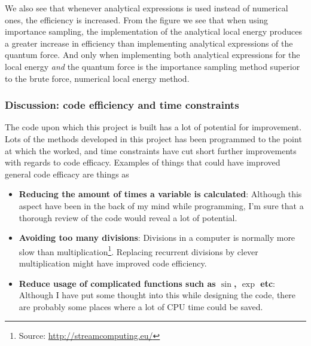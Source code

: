 We also see that whenever analytical expressions is used instead of numerical ones, the efficiency is increased. 
From the figure we see that when using importance sampling, the implementation of the analytical local energy produces a greater increase in efficiency than implementing analytical expressions of the quantum force.
And only when implementing both analytical expressions for the local energy \textit{and} the quantum force is the importance sampling method superior to the brute force, numerical local energy method. 





















\subsubsection{Discussion: code efficiency and time constraints}\label{sec:ce_tc}

The code upon which this project is built has a lot of potential for improvement. 
Lots of the methods developed in this project has been programmed to the point at which the worked, and time constraints have cut short further improvements with regards to code efficacy.
Examples of things that could have improved general code efficacy are things as 

\begin{itemize}
	\item \textbf{Reducing the amount of times a variable is calculated}:
	Although this aspect have been in the back of my mind while programming, I'm sure that a thorough review of the code would reveal a lot of potential. 
	\item \textbf{Avoiding too many divisions}: 
	Divisions in a computer is normally more slow than multiplication\footnote{Source: \href{http://streamcomputing.eu/blog/2012-07-16/how-expensive-is-an-operation-on-a-cpu/}{http://streamcomputing.eu/}}. Replacing recurrent divisions by clever multiplication might have improved code efficiency.
	\item \textbf{Reduce usage of complicated functions such as $\sin$, $\exp$ etc}:
	Although I have put some thought into this while designing the code, there are probably some places where a lot of CPU time could be saved. 
\end{itemize}

